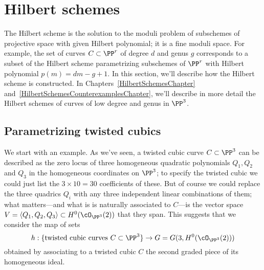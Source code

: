 \section{Hilbert schemes}\label{hilbert scheme section}

The Hilbert scheme is the solution to the moduli problem of subschemes of projective space with given Hilbert polynomial; it is a fine moduli space. For example, the set of curves $C \subset \PP^r$ of degree $d$ and genus $g$ corresponds to a subset of the Hilbert scheme parametrizing subschemes of $\PP^r$ with Hilbert polynomial $p(m) = dm - g + 1$. In this section, we'll describe how the Hilbert scheme is constructed. In Chapters~\ref{HilbertSchemesChapter} and~\ref{HilbertSchemesCounterexamplesChapter}, we'll describe in more detail the Hilbert schemes of curves of low degree and genus in $\PP^3$. 




\subsection{Parametrizing twisted cubics} We  start with an example. As we've seen, a twisted cubic curve $C \subset \PP^3$ can be described as the zero locus of three homogeneous quadratic polynomials $Q_1, Q_2$ and $Q_3$ in the homogeneous coordinates on $\PP^3$; to specify the twisted cubic we could just list the $3 \times 10 = 30$ coefficients of these. But of course we could replace the three quadrics $Q_i$ with any three independent linear combinations of them; what matters---and what is is naturally associated to $C$---is the vector space $V = \langle Q_1, Q_2, Q_3 \rangle \subset H^0(\cO_{\PP^3}(2))$ that they span. This suggests that we consider the map of sets
$$
h : \{ \text{twisted cubic curves } C \subset \PP^3 \} \to G = G(3, H^0(\cO_{\PP^3}(2)))
$$
obtained by associating to a twisted cubic $C$ the second graded piece of its homogeneous ideal. 

